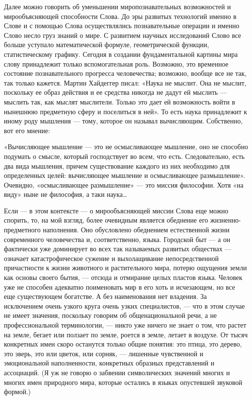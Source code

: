 Далее можно говорить об уменьшении миропознавательных возможностей и
мирообъясняющей способности Слова. До эры развитых технологий именно в Слове и
с помощью Слова осуществлялись познавательные операции и именно Слово несло
груз знаний о мире. С развитием научных исследований Слово все больше уступало
математической формуле, геометрической функции, статистическому графику.
Сегодня в создании фундаментальной картины мира слову принадлежит только
вспомогательная роль. Возможно, это временное состояние познавательного
прогресса человечества; возможно, вообще все не так, так только кажется. Мартин
Хайдеггер писал: «Наука не мыслит. Она не мыслит, поскольку ее образ действия и
ее средства никогда не дадут ей мыслить --- мыслить так, как мыслят мыслители.
Только это дает ей возможность войти в нынешнюю предметную сферу и поселиться в
ней». То есть наука принадлежит к иному роду мышления --- тому, которое он
называл вычисляющим. Собственно, вот его мнение:

«Вычисляющее мышление --- это не осмысливающее мышление, оно не способно подумать
о смысле, который господствует во всем, что есть. Следовательно, есть два вида
мышления, причем существование каждого из них необходимо для определенных
целей: вычисляющее мышление и осмысливающее размышление». Очевидно,
«осмысливающее размышление» --- это миссия философии. Хотя «на виду» ныне не
философия, а таки наука…

Если --- в этом контексте --- о мирообъясняющей миссии Слова еще можно спорить, то,
на мой взгляд, более очевидным является обеднение его жизненно-предметного
наполнения. Оно обусловлено обеднением естественной жизни современного
человечества и, соответственно, языка. Городской быт --- а он фактически уже
доминирует во всех так называемых развитых обществах --- означает
катастрофическое сужение и выхолащивание непосредственной причастности к жизни
животного и растительного мира, потерю ощущения земли как основы своего бытия,
--- отсюда и отмирание целых пластов языка. Человек уже не способен адекватно
поименовать мир в его хоть и исчезающем, но все еще существующем богатстве. А
без наименования нет владения. За исключением очень узкого круга очень узких
специалистов, --- что в этом случае не имеет значения, поскольку говорим об
общенациональной речи, а не профессиональной терминологии, --- никто уже ничего
не знает о том, что растет на земле, бегает или ползает по земле, роется в
земле, летает в воздухе. От тысяч конкретных имен скоро останутся только общие
понятия: это птица, это дерево, это зверь, это или цветок, или сорняк, —
лишенные чувственной и эмоциональной наполненности, конкретных образных
представлений и ассоциаций. (Я уж не говорю о забвении символических значений
многих и многих имен природного мира, которые остались в языках опустевшей
звуковой формой.)

